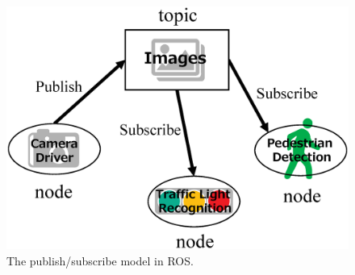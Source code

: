 \begin{figure}[!htbp]
  \centering
  \includegraphics[width=0.8\linewidth]{../figure/ros_pubsub.eps}
  \caption{\label{fig:ros_pubsub}
 The publish/subscribe model in ROS.}
\end{figure}

